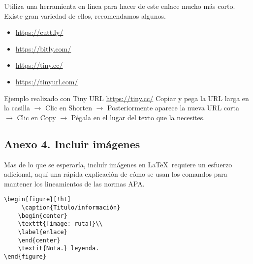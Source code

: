 Utiliza una herramienta en línea para hacer de este enlace mucho más corto. Existe gran variedad de ellos, recomendamos algunos.

\begin{itemize}
    \item \url{https://cutt.ly/}\\
    \item \url{https://bitly.com/}\\
    \item \url{https://tiny.cc/}\\
    \item \url{https://tinyurl.com/}
\end{itemize}
			 			

Ejemplo realizado con Tiny URL \url{https://tiny.cc/} 
Copiar y pega la URL larga en la casilla $\to$ Clic en Shorten $\to$ Posteriormente aparece la nueva URL corta $\to$ Clic en Copy $\to$ Pégala en el lugar del texto que la necesites.

\newpage

\subsection*{Anexo 4. Incluir imágenes}

Mas de lo que se esperaría, incluír imágenes en \LaTeX\  requiere un esfuerzo adicional, aquí una rápida explicación de cómo se usan los comandos para mantener los lineamientos de las normas APA.

\begin{verbatim}
\begin{figure}[!ht]
     \caption{Titulo/información}
    \begin{center}
    \texttt{[image: ruta]}\\
    \label{enlace}
    \end{center}
    \textit{Nota.} leyenda.
\end{figure}
\end{verbatim}

